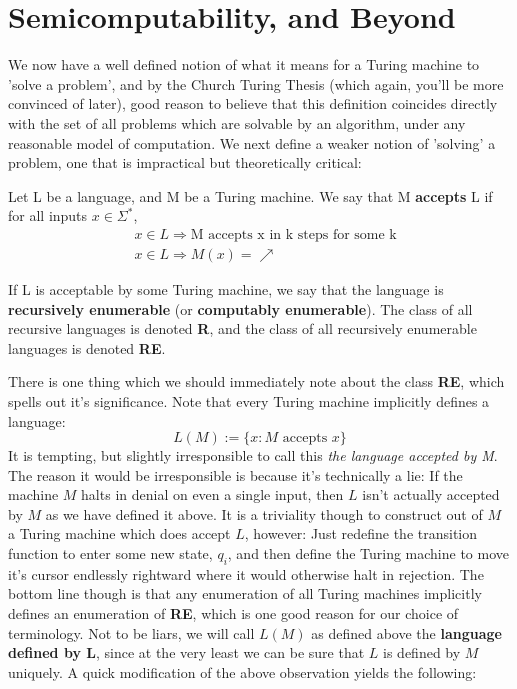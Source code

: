 \section{Semicomputability, and Beyond}
\par We now have a well defined notion of what it means for a Turing machine to 'solve a problem', and by the Church Turing Thesis (which again, you'll be more convinced of later), good reason to believe that this definition coincides directly with the set of all problems which are solvable by an algorithm, under any reasonable model of computation. We next define a weaker notion of 'solving' a problem, one that is impractical but theoretically critical: 
\begin{definition}
Let L be a language, and M be a Turing machine. We say that M \textbf{accepts} L if for all inputs $x\in\Sigma^*$,
\begin{align*}
    & x \in L \Rightarrow \textrm{M accepts x in k steps for some k} \\
    & x \in L \Rightarrow M(x)=\nearrow                     
\end{align*}
\end{definition}
If L is acceptable by some Turing machine, we say that the language is \textbf{recursively enumerable} (or \textbf{computably enumerable}). The class of all recursive languages is denoted \textbf{R}, and the class of all recursively enumerable languages is denoted \textbf{RE}.
\par
There is one thing which we should immediately note about the class \textbf{RE}, which spells out it's significance. Note that every Turing machine implicitly defines a language:
\[ L(M) := \{x: M\textrm{ accepts }x\} \]
It is tempting, but slightly irresponsible to call this \textit{the language accepted by M}. The reason it would be irresponsible is because it's technically a lie: If the machine $M$ halts in denial on even a single input, then $L$ isn't actually accepted by $M$ as we have defined it above. It is a triviality though to construct out of $M$ a Turing machine which does accept $L$, however: Just redefine the transition function to enter some new state, $q_i$, and then define the Turing machine to move it's cursor endlessly rightward where it would otherwise halt in rejection. The bottom line though is that any enumeration of all Turing machines implicitly defines an enumeration of \textbf{RE}, which is one good reason for our choice of terminology. Not to be liars, we will call $L(M)$ as defined above the \textbf{language defined by L}, since at the very least we can be sure that $L$ is defined by $M$ uniquely. A quick modification of the above observation yields the following:
